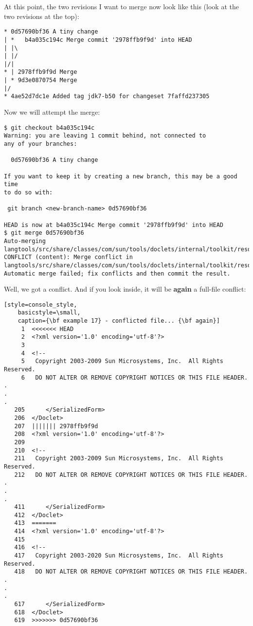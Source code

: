 At this point, the two revisions I want to merge now look like this (look at the two revisions at the top):
\begin{lstlisting}[style=console_style,
	basicstyle=\small,
	caption={\bf example 17} - history of revisions]
* 0d57690bf36 A tiny change
| *   b4a035c194c Merge commit '2978ffb9f9d' into HEAD
| |\  
| |/  
|/|   
* | 2978ffb9f9d Merge
| * 9d3e0870754 Merge
|/  
* 4ae52d7dc1e Added tag jdk7-b50 for changeset 7faffd237305
\end{lstlisting}

Now we will attempt the merge:

\begin{lstlisting}[style=console_style,
	basicstyle=\small,
	caption={\bf example 17} - new merge]
$ git checkout b4a035c194c
Warning: you are leaving 1 commit behind, not connected to
any of your branches:

  0d57690bf36 A tiny change

If you want to keep it by creating a new branch, this may be a good time
to do so with:

 git branch <new-branch-name> 0d57690bf36

HEAD is now at b4a035c194c Merge commit '2978ffb9f9d' into HEAD
$ git merge 0d57690bf36
Auto-merging langtools/src/share/classes/com/sun/tools/doclets/internal/toolkit/resources/doclet.xml
CONFLICT (content): Merge conflict in langtools/src/share/classes/com/sun/tools/doclets/internal/toolkit/resources/doclet.xml
Automatic merge failed; fix conflicts and then commit the result.
\end{lstlisting}

Well, we got a conflict. And if you look inside, it will be {\bf again} a full-file conflict:

\begin{lstlisting}[style=console_style,
	basicstyle=\small,
	caption={\bf example 17} - conflicted file... {\bf again}]
     1  <<<<<<< HEAD
     2  <?xml version='1.0' encoding='utf-8'?>
     3  
     4  <!--
     5   Copyright 2003-2009 Sun Microsystems, Inc.  All Rights Reserved.
     6   DO NOT ALTER OR REMOVE COPYRIGHT NOTICES OR THIS FILE HEADER.
.
.
.
   205      </SerializedForm>
   206  </Doclet>
   207  ||||||| 2978ffb9f9d
   208  <?xml version='1.0' encoding='utf-8'?>
   209  
   210  <!--
   211   Copyright 2003-2009 Sun Microsystems, Inc.  All Rights Reserved.
   212   DO NOT ALTER OR REMOVE COPYRIGHT NOTICES OR THIS FILE HEADER.
.
.
.
   411      </SerializedForm>
   412  </Doclet>
   413  =======
   414  <?xml version='1.0' encoding='utf-8'?>
   415  
   416  <!--
   417   Copyright 2003-2020 Sun Microsystems, Inc.  All Rights Reserved.
   418   DO NOT ALTER OR REMOVE COPYRIGHT NOTICES OR THIS FILE HEADER.
.
.
.
   617      </SerializedForm>
   618  </Doclet>
   619  >>>>>>> 0d57690bf36
\end{lstlisting}

